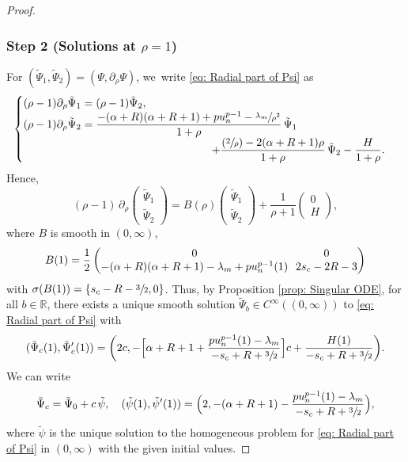 \documentclass[10pt]{amsart}
\newcommand{\Psfrac}[2]{(\sfrac{#1}{#2})}
\theoremstyle{plain}
\theoremstyle{definition}
\begin{document}
\begin{proof}
\subsubsection*{Step 2 (Solutions at $\rho=1$)}
For $(\tilde \Psi_1,\tilde \Psi_2)=(\Psi,\partial_\rho\Psi)$, we~write \eqref{eq: Radial part of Psi} as
\[
\begin{cases}
(\rho-1)\partial_\rho \tilde \Psi_1=(\rho-1)\tilde \Psi_2,\\
(\rho-1)\partial_\rho \tilde \Psi_2=\dfrac{-(\alpha+R)(\alpha+R+1)+p u_n^{p-1}-\sfrac{\lambda_m}{\rho^2}}{1+\rho}\,\tilde \Psi_1\\
\hspace*{6cm}+\dfrac{\Psfrac{2}{\rho}-2(\alpha+R+1)\rho}{1+\rho}\,\tilde \Psi_2-\dfrac{H}{1+\rho}.
\end{cases}
\]
Hence,
\[
(\rho-1)\,\partial_\rho\begin{pmatrix}
\tilde\Psi_1\\
\tilde\Psi_2
\end{pmatrix}
= B(\rho)\begin{pmatrix}
\tilde\Psi_1\\
\tilde\Psi_2
\end{pmatrix}
+\frac{1}{\rho+1}\begin{pmatrix}
0\\
H
\end{pmatrix},
\]
where $B$ is smooth in $(0,\infty)$,
\[\arraycolsep3.5pt
B(1)=\frac{1}{2}\begin{pmatrix}
0 & 0\\
-(\alpha+R)(\alpha+R+1)-\lambda_m+pu_n^{p-1}(1) & 2s_c-2R-3\\
\end{pmatrix}
\]
with $\sigma(B(1))=\{s_c-R-\sfrac{3}{2},0\}$. Thus, by Proposition \ref{prop: Singular ODE}, for all $b\in\mathbb R$, there exists a unique smooth solution $\tilde \Psi_b\in C^\infty ((0,\infty))$ to \eqref{eq: Radial part of Psi} with
\[
(\tilde\Psi_c(1), \tilde\Psi_c'(1))=\bigg(2c,-\Big[\alpha+R+1+\frac{pu_n^{p-1}(1)-\lambda_m}{-s_c+R+\sfrac{3}{2}} \Big]c+\frac{H(1)}{-s_c+R+\sfrac{3}{2}}\bigg).
\]
We can write
\[
\tilde \Psi_c = \tilde \Psi_0+c\,\tilde\psi,\quad (\tilde\psi(1),\tilde\psi'(1))= \Big(2,-(\alpha+R+1)-\frac{pu_n^{p-1}(1)-\lambda_m}{-s_c+R+\sfrac{3}{2}} \Big),
\]
where $\tilde \psi$ is the unique solution to the homogeneous problem for \eqref{eq: Radial part of Psi} in $(0,\infty)$ with the given initial values.


\end{proof}
\end{document}
